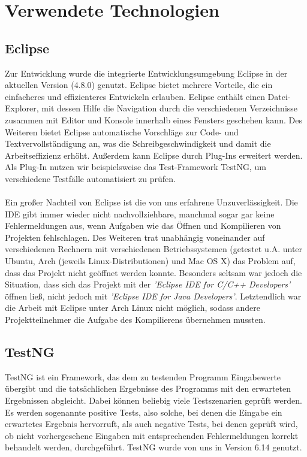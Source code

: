 
\section{Verwendete Technologien}

\subsection{Eclipse}
Zur Entwicklung wurde die integrierte Entwicklungsumgebung Eclipse in der aktuellen Version (4.8.0) genutzt. 
Eclipse bietet mehrere Vorteile, die ein einfacheres und effizienteres Entwickeln erlauben. Eclipse enthält einen Datei-Explorer, mit dessen Hilfe die Navigation durch die verschiedenen Verzeichnisse zusammen mit Editor und Konsole innerhalb eines Fensters geschehen kann. Des Weiteren bietet Eclipse automatische Vorschläge zur Code- und Textvervollständigung an, was die Schreibgeschwindigkeit und damit die Arbeitseffizienz erhöht. 
Außerdem kann Eclipse durch Plug-Ins erweitert werden. Als Plug-In nutzen wir beispielsweise das Test-Framework TestNG, um verschiedene Testfälle automatisiert zu prüfen.
\\\\
Ein großer Nachteil von Eclipse ist die von uns erfahrene Unzuverlässigkeit. Die IDE gibt immer wieder nicht nachvollziehbare, manchmal sogar gar keine Fehlermeldungen aus, wenn Aufgaben wie das Öffnen und Kompilieren von Projekten fehlschlagen. Des Weiteren trat unabhängig voneinander auf verschiedenen Rechnern mit verschiedenen Betriebssystemen (getestet u.A. unter Ubuntu, Arch (jeweils Linux-Distributionen) und Mac OS X) das Problem auf, dass das Projekt nicht geöffnet werden konnte. Besonders seltsam war jedoch die Situation, dass sich das Projekt mit der \textit{'Eclipse IDE for C/C++ Developers'} öffnen ließ, nicht jedoch mit \textit{'Eclipse IDE for Java Developers'}. Letztendlich war die Arbeit mit Eclipse unter Arch Linux nicht möglich, sodass andere Projektteilnehmer die Aufgabe des Kompilierens übernehmen mussten.

\subsection{TestNG}
TestNG ist ein Framework, das dem zu testenden Programm Eingabewerte übergibt und die tatsächlichen Ergebnisse des Programms mit den erwarteten Ergebnissen abgleicht. Dabei können beliebig viele Testszenarien geprüft werden. Es werden sogenannte positive Tests, also solche, bei denen die Eingabe ein erwartetes Ergebnis hervorruft, als auch negative Tests, bei denen geprüft wird, ob nicht vorhergesehene Eingaben mit entsprechenden Fehlermeldungen korrekt behandelt werden, durchgeführt. TestNG wurde von uns in Version 6.14 genutzt.

